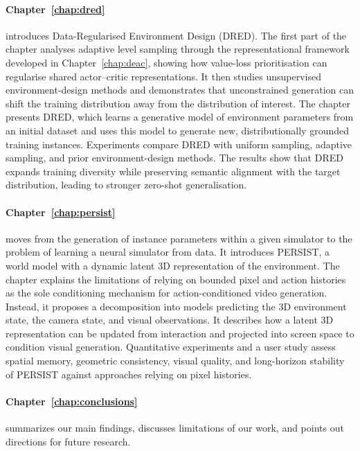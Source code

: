 \paragraph{Chapter~\ref{chap:dred}} introduces Data-Regularised Environment Design (DRED). The first part of the chapter analyses adaptive level sampling through the representational framework developed in Chapter~\ref{chap:deac}, showing how value-loss prioritisation can regularise shared actor--critic representations. It then studies unsupervised environment-design methods and demonstrates that unconstrained generation can shift the training distribution away from the distribution of interest. The chapter presents DRED, which learns a generative model of environment parameters from an initial dataset and uses this model to generate new, distributionally grounded training instances. Experiments compare DRED with uniform sampling, adaptive sampling, and prior environment-design methods. The results show that DRED expands training diversity while preserving semantic alignment with the target distribution, leading to stronger zero-shot generalisation.

\paragraph{Chapter~\ref{chap:persist}} moves from the generation of instance parameters within a given simulator to the problem of learning a neural simulator from data. It introduces PERSIST, a world model with a dynamic latent 3D representation of the environment. The chapter explains the limitations of relying on bounded pixel and action histories as the sole conditioning mechanism for action-conditioned video generation. Instead, it proposes a decomposition into models predicting the 3D environment state, the camera state, and visual observations. It describes how a latent 3D representation can be updated from interaction and projected into screen space to condition visual generation. Quantitative experiments and a user study assess spatial memory, geometric consistency, visual quality, and long-horizon stability of PERSIST against approaches relying on pixel histories.

\paragraph{Chapter~\ref{chap:conclusions}} summarizes our main findings, discusses limitations of our work, and points out directions for future research.

